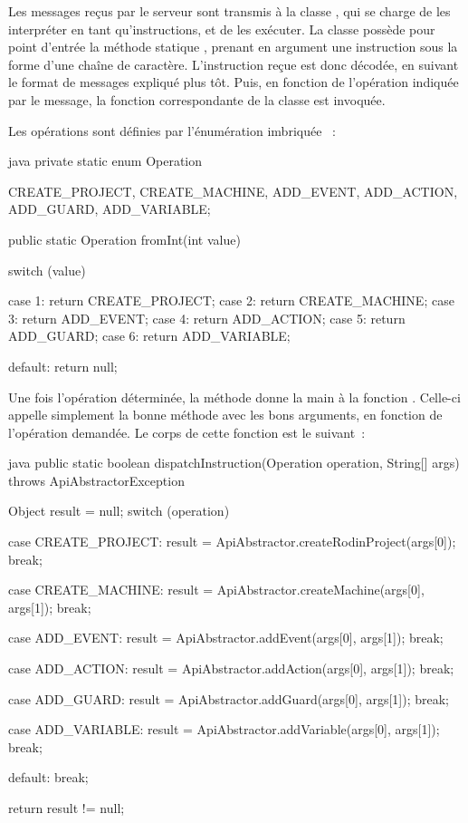 Les messages reçus par le serveur sont transmis à la classe , qui se charge de les interpréter en tant qu'instructions, et de les exécuter.
La classe  possède pour point d'entrée la méthode statique , prenant en argument une instruction sous la forme d'une chaîne de caractère.
L'instruction reçue est donc décodée, en suivant le format de messages expliqué plus tôt.
Puis, en fonction de l'opération indiquée par le message, la fonction correspondante de la classe  est invoquée.

Les opérations sont définies par l'énumération imbriquée ~:

\begin{imtaCode}{java}
private static enum Operation {
    CREATE_PROJECT,
    CREATE_MACHINE,
    ADD_EVENT,
    ADD_ACTION,
    ADD_GUARD,
    ADD_VARIABLE;

    public static Operation fromInt(int value) {
        switch (value) {
            case 1:
                return CREATE_PROJECT;
            case 2:
                return CREATE_MACHINE;
            case 3:
                return ADD_EVENT;
            case 4:
                return ADD_ACTION;
            case 5:
                return ADD_GUARD;
            case 6:
                return ADD_VARIABLE;

            default:
                return null;
        }
    }
}
\end{imtaCode}

Une fois l'opération déterminée, la méthode  donne la main à la fonction .
Celle-ci appelle simplement la bonne méthode avec les bons arguments, en fonction de l'opération demandée.
Le corps de cette fonction est le suivant~:

\begin{imtaCode}{java}
public static boolean dispatchInstruction(Operation operation, String[] args) throws ApiAbstractorException {
    Object result = null;
    switch (operation) {
        case CREATE_PROJECT:
            result = ApiAbstractor.createRodinProject(args[0]);
            break;
                
        case CREATE_MACHINE:
            result = ApiAbstractor.createMachine(args[0], args[1]);
            break;
                
        case ADD_EVENT:
            result = ApiAbstractor.addEvent(args[0], args[1]);
            break;
                
        case ADD_ACTION:
            result = ApiAbstractor.addAction(args[0], args[1]);
            break;
                
        case ADD_GUARD:
            result = ApiAbstractor.addGuard(args[0], args[1]);
            break;
                
        case ADD_VARIABLE:
            result = ApiAbstractor.addVariable(args[0], args[1]);
            break;
                
        default:
            break;
    }
    
    return result != null;
}
\end{imtaCode}


